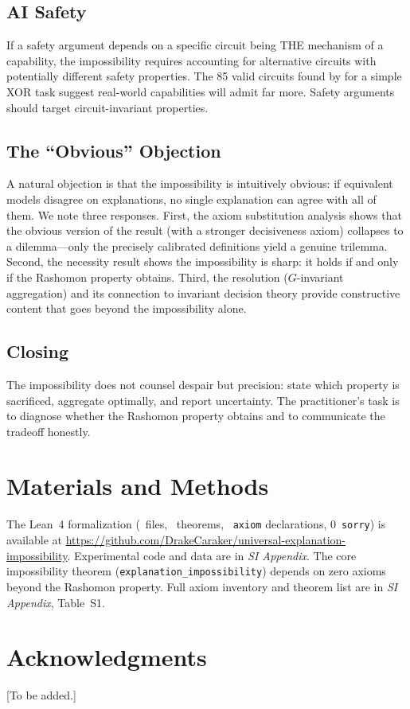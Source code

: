 \documentclass[twocolumn]{article}
\begin{document}
\subsection{AI Safety}

If a safety argument depends on a specific circuit being THE mechanism of
a capability, the impossibility requires accounting for alternative
circuits with potentially different safety properties. The 85 valid
circuits found by \cite{meloux2025everything} for a simple XOR task
suggest real-world capabilities will admit far more. Safety arguments
should target circuit-invariant properties.

\subsection{The ``Obvious'' Objection}

A natural objection is that the impossibility is intuitively obvious: if
equivalent models disagree on explanations, no single explanation can
agree with all of them. We note three responses. First, the axiom
substitution analysis shows that the obvious version of the result (with
a stronger decisiveness axiom) collapses to a dilemma---only the
precisely calibrated definitions yield a genuine trilemma. Second, the
necessity result shows the impossibility is sharp: it holds if and only
if the Rashomon property obtains. Third, the resolution ($G$-invariant
aggregation) and its connection to invariant decision theory provide
constructive content that goes beyond the impossibility alone.



\subsection{Closing}

The impossibility does not counsel despair but precision: state which
property is sacrificed, aggregate optimally, and report uncertainty.
The practitioner's task is to diagnose whether the Rashomon property
obtains and to communicate the tradeoff honestly.

\section*{Materials and Methods}
The Lean~4 formalization (\ClaimMainFiles~files, \ClaimMainTheorems~theorems,
\ClaimMainAxioms~\texttt{axiom} declarations, 0~\texttt{sorry}) is available at \url{https://github.com/DrakeCaraker/universal-explanation-impossibility}. Experimental code and
data are in \emph{SI Appendix}. The core impossibility theorem
(\texttt{explanation\_impossibility}) depends on zero axioms beyond the
Rashomon property. Full axiom inventory and theorem list are in
\emph{SI Appendix}, Table~S1.

\section*{Acknowledgments}
[To be added.]



\end{document}
